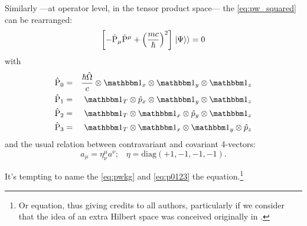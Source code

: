 Similarly
---at operator level, in the tensor product space---
the \eqref{eq:pw_squared} can be rearranged:
\begin{equation}\label{eq:pwkg}
  \qty[- \hat{\mathrm{P}}_{\mu} \hat{\mathrm{P}}^{\mu} + \qty(\frac{mc}{\hbar})^2]\left.\left| \Psi \right\rangle\right\rangle = 0
\end{equation}
with
\begin{equation}
\begin{aligned}\label{eq:p0123}
  \hat{\mathrm{P}}_0 &=& \frac{\hbar\hat{\Omega}}{c}  \ox \idop_x   \ox \idop_y   \ox \idop_z \\
  \hat{\mathrm{P}}_1 &=& \idop_T                      \ox \hat{p}_x \ox \idop_y   \ox \idop_z \\
  \hat{\mathrm{P}}_2 &=& \idop_T                      \ox \idop_x   \ox \hat{p}_y \ox \idop_z \\
  \hat{\mathrm{P}}_3 &=& \idop_T                      \ox \idop_x   \ox \idop_y   \ox \hat{p}_z
\end{aligned}
\end{equation}
and the usual relation between contravariant and covariant 4-vectors:
\begin{equation}
  a_\mu = \eta_{\nu}^{\mu} a^{\nu} \text{;} \quad
  \eta = \mathrm{diag}(+1, -1, -1, -1)
  \text{.}
\end{equation}

It's tempting to name the \eqref{eq:pwkg} and \eqref{eq:p0123} the 
equation.\footnote{
  Or 
  equation, thus giving
  credits to all authors, particularly if we consider that the idea of an extra Hilbert space
  was conceived originally in \cite{Lloyd:Time}.
}

